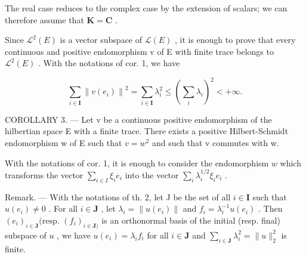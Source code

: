 The real case reduces to the complex case by the extension of scalars; we can therefore assume that \(\mathbf{K} = \mathbf{C}\) .

Since \(\mathcal{L}^{2}(E)\) is a vector subspace of \(\mathcal{L}(E)\) , it is enough to prove that every continuous and positive endomorphism v of E with finite trace belongs to \(\mathcal{L}^{2}(E)\) . With the notations of cor. 1, we have

\[
\sum_ {i \in \mathbf {I}} \left\| v (e _ {i}) \right\| ^ {2} = \sum_ {i \in \mathbf {I}} \lambda_ {i} ^ {2} \leqslant (\sum_ {i} \lambda_ {i}) ^ {2} <   + \infty .
\]

COROLLARY 3. --- Let v be a continuous positive endomorphism of the hilbertian space E with a finite trace. There exists a positive Hilbert-Schmidt endomorphism w of E such that \(v = w^{2}\) and such that v commutes with w.

With the notations of cor. 1, it is enough to consider the endomorphism \(w\) which transforms the vector \(\sum_{i\in I}\xi_i e_i\) into the vector \(\sum_{i}\lambda_i^{1 / 2}\xi_i e_i\) .

Remark. --- With the notations of th. 2, let J be the set of all \(i \in \mathbf{I}\) such that \(u(e_i) \neq 0\) . For all \(i \in \mathbf{J}\) , let \(\lambda_i = \| u(e_i)\|\) and \(f_i = \lambda_i^{-1}u(e_i)\) . Then \((e_i)_{i \in \mathbf{J}}(\text{resp. } (f_i)_{i \in \mathbf{J})}\) is an orthonormal basis of the initial (resp. final) subspace of \(u\) , we have \(u(e_i) = \lambda_i f_i\) for all \(i \in \mathbf{J}\) and \(\sum_{i \in \mathbf{J}} \lambda_i^2 = \| u\|_2^2\) is finite.

